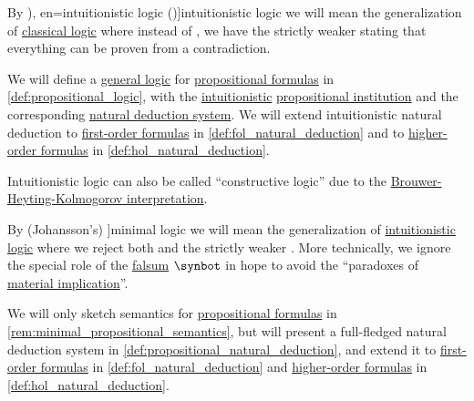 \begin{concept}\label{con:intuitionistic_logic}\mimprovised
  By \term[ru=интуиционисткая логика (\cite[58]{ШеньВерещагин2017ЯзыкиИИсчисления}), en=intuitionistic logic (\cite[8]{TroelstraSchwichtenberg2000BasicProofTheory})]{intuitionistic logic} we will mean the generalization of \hyperref[con:classical_logic]{classical logic} where instead of , we have the strictly weaker  stating that everything can be proven from a contradiction.

  We will define a \hyperref[def:general_logic]{general logic} for \hyperref[def:propositional_formula]{propositional formulas} in \cref{def:propositional_logic}, with the \hyperref[def:truth_value_algebra/intuitionistic]{intuitionistic} \hyperref[def:propositional_institution]{propositional institution} and the corresponding \hyperref[def:propositional_natural_deduction]{natural deduction system}. We will extend intuitionistic natural deduction to \hyperref[def:fol_formula]{first-order formulas} in \cref{def:fol_natural_deduction} and to \hyperref[def:hol_expression/formula]{higher-order formulas} in \cref{def:hol_natural_deduction}.
\end{concept}
\begin{comments}
  \item Intuitionistic logic can also be called \enquote{constructive logic} due to the \hyperref[con:brouwer_heyting_kolmogorov_interpretation]{Brouwer-Heyting-Kolmogorov interpretation}.
\end{comments}

\begin{concept}\label{con:minimal_logic}\mimprovised
  By (Johansson's) \term[en=minimal logic (\cite[1]{VanDerMolen2016MinimalLogic}]{minimal logic} we will mean the generalization of \hyperref[con:intuitionistic_logic]{intuitionistic logic} where we reject both  and the strictly weaker . More technically, we ignore the special role of the \hyperref[def:propositional_alphabet/constants/falsum]{falsum} \( \synbot \) in hope to avoid the \enquote{paradoxes of \hyperref[con:material_implication]{material implication}}.

  We will only sketch semantics for \hyperref[def:propositional_formula]{propositional formulas} in \cref{rem:minimal_propositional_semantics}, but will present a full-fledged natural deduction system in \cref{def:propositional_natural_deduction}, and extend it to \hyperref[def:fol_formula]{first-order formulas} in \cref{def:fol_natural_deduction} and \hyperref[def:hol_expression/formula]{higher-order formulas} in \cref{def:hol_natural_deduction}.
\end{concept}
